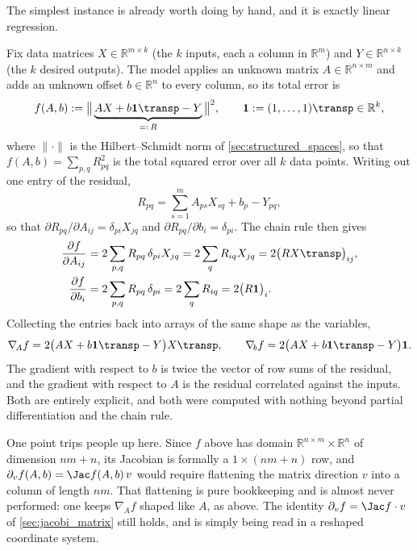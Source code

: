 The simplest instance is already worth doing by hand, and it is exactly linear regression.

\begin{aiexample}
\label{ex:least_squares_matrix_gradient}
Fix data matrices $X \in \mathbb{R}^{m\times k}$ (the $k$ inputs, each a column in
$\mathbb{R}^m$) and $Y \in \mathbb{R}^{n\times k}$ (the $k$ desired outputs). The model applies
an unknown matrix $A \in \mathbb{R}^{n\times m}$ and adds an unknown offset
$b \in \mathbb{R}^n$ to every column, so its total error is
\[f(A,b) := \big\lVert \underbrace{AX + b\mathbf{1}\transp - Y}_{=:\,R} \big\rVert^2,
  \qquad \mathbf{1} := (1,\dots,1)\transp \in \mathbb{R}^k,\]
where $\lVert\cdot\rVert$ is the Hilbert--Schmidt norm of \cref{sec:structured_spaces}, so that
$f(A,b) = \sum_{p,q} R_{pq}^2$ is the total squared error over all $k$ data points. Writing out
one entry of the residual,
\[R_{pq} = \sum_{s=1}^{m} A_{ps}X_{sq} + b_p - Y_{pq},\]
so that $\partial R_{pq}/\partial A_{ij} = \delta_{pi}X_{jq}$ and
$\partial R_{pq}/\partial b_i = \delta_{pi}$. The chain rule then gives
\begin{align}
  \frac{\partial f}{\partial A_{ij}} &= 2\sum_{p,q} R_{pq}\,\delta_{pi}X_{jq}
    = 2\sum_{q} R_{iq}X_{jq} = 2\big(RX\transp\big)_{ij}, \nonumber \\
  \frac{\partial f}{\partial b_i} &= 2\sum_{p,q} R_{pq}\,\delta_{pi}
    = 2\sum_{q} R_{iq} = 2\big(R\mathbf{1}\big)_i. \nonumber
\end{align}
Collecting the entries back into arrays of the same shape as the variables,
\[\nabla_{\!A} f = 2\big(AX + b\mathbf{1}\transp - Y\big)X\transp, \qquad
  \nabla_{\!b} f = 2\big(AX + b\mathbf{1}\transp - Y\big)\mathbf{1}.\]
The gradient with respect to $b$ is twice the vector of row sums of the residual, and the
gradient with respect to $A$ is the residual correlated against the inputs. Both are entirely
explicit, and both were computed with nothing beyond partial differentiation and the chain rule.
\end{aiexample}

\begin{remark}
One point trips people up here. Since $f$ above has domain
$\mathbb{R}^{n\times m}\times\mathbb{R}^n$ of dimension $nm+n$, its Jacobian is formally a
$1\times(nm+n)$ row, and $\partial_v f(A,b) = \Jac f(A,b)\,v$ would require flattening the matrix
direction $v$ into a column of length $nm$. That flattening is pure bookkeeping and is almost
never performed: one keeps $\nabla_{\!A}f$ shaped like $A$, as above. The identity
$\partial_vf = \Jac f\cdot v$ of \cref{sec:jacobi_matrix} still holds, and is simply being read
in a reshaped coordinate system.
\end{remark}

